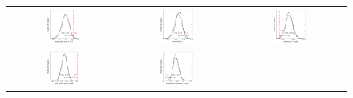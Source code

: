 \documentclass[12pt,preprint]{aastex}
\begin{document}
\clearpage
\begin{figure}
\begin{center}
\begin{tabular}{@{}c@{}c@{}c@{}}
\includegraphics[width=0.33\textwidth]{param-hist-0} &
\includegraphics[width=0.33\textwidth]{param-hist-1} &
\includegraphics[width=0.33\textwidth]{param-hist-2} \\
\includegraphics[width=0.33\textwidth]{param-hist-3} &
\includegraphics[width=0.33\textwidth]{param-hist-4} &

\end{tabular}
\end{center}
\end{figure}
\end{document}
